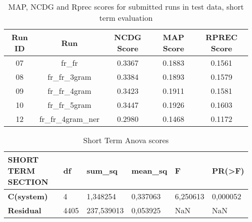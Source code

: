 \begin{table}[h!]
    \begin{center}
        \caption{MAP, NCDG and Rprec scores for submitted runs in test data, short term evaluation}
        \label{tab:shortTerms_scores}
        \begin{tabular}{|c|c||c|c|c|}
            \hline
            \textbf{Run ID} & \textbf{Run} & \textbf{NCDG Score} & \textbf{MAP Score} & \textbf{RPREC Score}\\
            \hline\hline
            07 & fr\_fr & 0.3367 & 0.1883 & 0.1561 \\
            \hline
            08 & fr\_fr\_3gram & 0.3384 & 0.1893 & 0.1579 \\
            \hline
            09 & fr\_fr\_4gram & 0.3423 & 0.1911 & 0.1581 \\
            \hline
            10 & fr\_fr\_5gram & 0.3447 & 0.1926 & 0.1603 \\
            \hline
            12 & fr\_fr\_4gram\_ner & 0.2980 & 0.1468 & 0.1172 \\
            \hline
        \end{tabular}
    \end{center}
\end{table}
\begin{table}[h!]
    \centering
    \caption{Short Term Anova scores}
    \begin{tabular}{|l|l|l|l|l|l|}
    \hline
        \textbf{SHORT TERM SECTION} & \textbf{df} & \textbf{sum\_sq} & \textbf{mean\_sq} & \textbf{F} & \textbf{PR(>F)} \\ \hline\hline
        \textbf{C(system)} & 4 & 1,348254 & 0,337063 & 6,250613 & 0,000052 \\ \hline
        \textbf{Residual} & 4405 & 237,539013 & 0,053925 & NaN & NaN \\ \hline
    \end{tabular}
    \label{ST_Anova}
\end{table}

